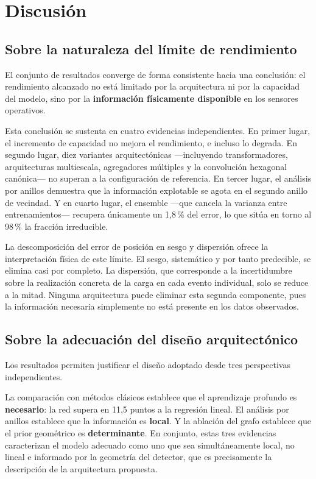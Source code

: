 \section{Discusión}
\label{sec:discusion}

\subsection{Sobre la naturaleza del límite de rendimiento}

El conjunto de resultados converge de forma consistente hacia una conclusión: el rendimiento
alcanzado no está limitado por la arquitectura ni por la capacidad del modelo, sino por la
\textbf{información físicamente disponible} en los sensores operativos.

Esta conclusión se sustenta en cuatro evidencias independientes. En primer lugar, el incremento de
capacidad no mejora el rendimiento, e incluso lo degrada. En segundo lugar, diez variantes
arquitectónicas ---incluyendo transformadores, arquitecturas multiescala, agregadores múltiples y la
convolución hexagonal canónica--- no superan a la configuración de referencia. En tercer lugar, el
análisis por anillos demuestra que la información explotable se agota en el segundo anillo de
vecindad. Y en cuarto lugar, el ensemble ---que cancela la varianza entre entrenamientos--- recupera
únicamente un 1,8\,\% del error, lo que sitúa en torno al 98\,\% la fracción irreducible.

La descomposición del error de posición en sesgo y dispersión ofrece la interpretación física de
este límite. El sesgo, sistemático y por tanto predecible, se elimina casi por completo. La
dispersión, que corresponde a la incertidumbre sobre la realización concreta de la carga en cada
evento individual, solo se reduce a la mitad. Ninguna arquitectura puede eliminar esta segunda
componente, pues la información necesaria simplemente no está presente en los datos observados.

\subsection{Sobre la adecuación del diseño arquitectónico}

Los resultados permiten justificar el diseño adoptado desde tres perspectivas independientes.

La comparación con métodos clásicos establece que el aprendizaje profundo es \textbf{necesario}: la
red supera en 11,5 puntos a la regresión lineal. El análisis por anillos establece que la
información es \textbf{local}. Y la ablación del grafo establece que el prior geométrico es
\textbf{determinante}. En conjunto, estas tres evidencias caracterizan el modelo adecuado como uno
que sea simultáneamente local, no lineal e informado por la geometría del detector, que es
precisamente la descripción de la arquitectura propuesta.

